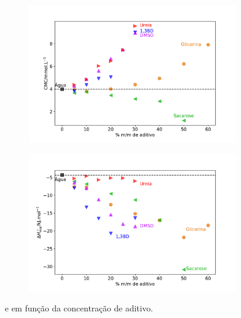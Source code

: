		\begin{figure}[h]
			\centering
			\begin{subfigure}[t]{0.7\textwidth}
				\centering
				\includegraphics[width=\textwidth]{imagens/itc/ITC_cmc_adit}
				\caption{\cmc}
				\label{fig:cmc_por_conc}
			\end{subfigure} 
		
			\begin{subfigure}[t]{0.7\textwidth}
				\centering
				\includegraphics[width=\textwidth]{imagens/itc/ITC_DH_adit}
				\caption{\DHmic}
				\label{fig:dh_por_conc}
			\end{subfigure}
			
			\caption{\cmc{} e \DHmic{} em função da concentração de aditivo.}
			\label{fig:cmc_dh_por_conc}
		\end{figure}
	
		\FloatBarrier
		
